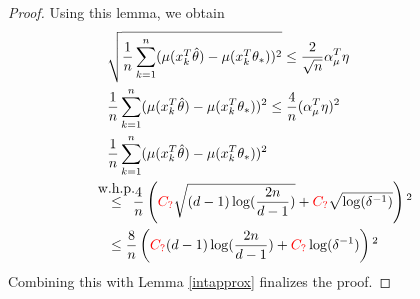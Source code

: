 \documentclass[twoside]{article} \usepackage{aistats2017}
\newcommand{\uc}{
\color{red}C_?\color{black}
}
\newcommand{\whp}[1]{\stackrel{\mathclap{\normalfont\mbox{w.h.p.}}}{#1}}
\begin{document}
\begin{proof}
Using this lemma, we obtain
\begin{align*}
    &\sqrt{\frac{1}{n}\sum_{k=1}^n(\mu(x_k^T\hat{\theta})-\mu(x_k^T\theta_*))^2}\leq \frac{2}{\sqrt{n}}\alpha_\mu^T\eta\\
    &\frac{1}{n}\sum_{k=1}^n(\mu(x_k^T\hat{\theta})-\mu(x_k^T\theta_*))^2\leq \frac{4}{n}(\alpha_\mu^T\eta)^2\\
    &\frac{1}{n}\sum_{k=1}^n(\mu(x_k^T\hat{\theta})-\mu(x_k^T\theta_*))^2\\
    &\whp{\leq}\,\,\, \frac{4}{n}\left(\uc\sqrt{(d-1)\log(\frac{2n}{d-1})}+\uc\sqrt{\log(\delta^{-1})}\right)^2\\
    &\leq \frac{8}{n}\left(\uc(d-1)\log(\frac{2n}{d-1})+\uc\log(\delta^{-1})\right)^2
\end{align*}
Combining this with Lemma \ref{intapprox} finalizes the proof.
\end{proof}
\end{document}
